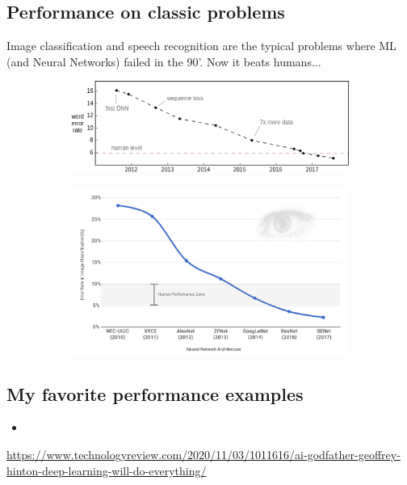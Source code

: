 \subsection{Performance on classic problems}
Image classification and speech recognition are the typical problems where ML (and Neural Networks) failed in the 90’. Now it beats humans...
\begin{figure}[ht]
	\centering
	\begin{subfigure}{.5\textwidth}
		\centering
		\includegraphics[width=1\linewidth]{figure_ml/speech.png}
	\end{subfigure}%
	\begin{subfigure}{.5\textwidth}
		\centering
		\includegraphics[width=1\linewidth]{figure_ml/img_class.png}
	\end{subfigure}
\end{figure}


\subsection{My favorite performance examples}

\begin{itemize}
	\item 
\end{itemize}

\url{https://www.technologyreview.com/2020/11/03/1011616/ai-godfather-geoffrey-hinton-deep-learning-will-do-everything/}

